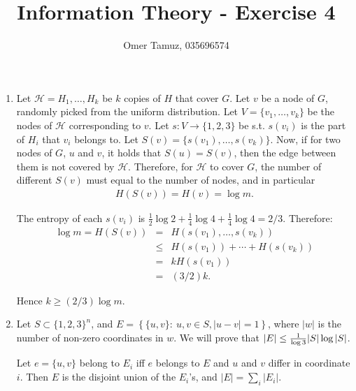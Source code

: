 \documentclass[11pt]{article} \usepackage{amssymb}
\newcommand{\half}{{\textstyle \frac12}}
\newcommand{\fourth}{{\textstyle \frac14}}
\begin{document}
\title{Information Theory - Exercise 4}

 \author{Omer Tamuz, 035696574}
\maketitle


\begin{enumerate}
\item

Let $\mathcal{H}=H_1,\ldots,H_k$ be $k$ copies of $H$ that cover $G$. 
Let $v$ be a node of $G$, randomly picked from the uniform distribution. 
Let $V=\{v_1,\ldots,v_k\}$ 
be the nodes of $\mathcal{H}$ corresponding to $v$. Let $s:V\to\{1,2,3\}$ be s.t.
$s(v_i)$ is the part of $H_i$ that $v_i$ belongs to. 
Let $S(v)=\{s(v_1),\ldots,s(v_k)\}$. 
Now, if for two nodes of $G$, $u$ and $v$, it holds that $S(u)=S(v)$, then
the edge between them is not covered by $\mathcal{H}$. Therefore, for $\mathcal{H}$
to cover $G$, the
number of different $S(v)$ must equal to the number of nodes, and in particular
\begin{eqnarray*}
  H(S(v))=H(v)=\log m.
\end{eqnarray*}

The entropy of each $s(v_i)$ is $\half\log 2+\fourth\log 4+\fourth \log 4 = 2/3$.
Therefore:
\begin{eqnarray*}
\log m = H(S(v)) &=& H(s(v_1),\ldots,s(v_k))  \\
&\leq& H(s(v_1))+\cdots+H(s(v_k))\\
&=& kH(s(v_1))\\
&=& (3/2)k.
\end{eqnarray*}

Hence $k\geq (2/3)\log m$.
\item

Let $S\subset\{1,2,3\}^n$, and
 $E=\left\{\{u,v\}:\:u,v\in S, |u-v|=1\right\}$, where $|w|$ is the number of
non-zero coordinates in $w$.
We will prove that $|E|\leq {1\over \log 3}|S|\log|S|$.

Let $e=\{u,v\}$ belong to $E_i$ iff $e$ belongs to $E$ and 
$u$ and $v$ differ in coordinate $i$. Then $E$ is the disjoint union of the $E_i$'s,
and $|E|=\sum_i|E_i|$.


\end{enumerate}
\end{document}
